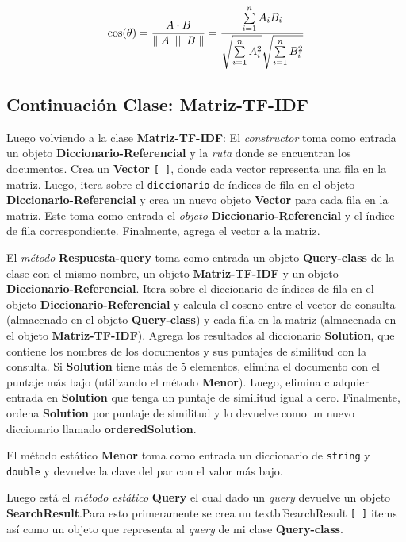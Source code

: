 \documentclass[a4paper,12pt]{article}
\begin{document}
\begin{enumerate}
\begin{equation}
\cos(\theta) = \frac{A\cdot B}{\parallel A\parallel \* \parallel B\parallel}= \frac{\sum\limits_{i=1}^n A_i\* B_i}{\sqrt{\sum\limits_{i=1}^n A_i^2}\* \sqrt{\sum\limits_{i=1}^n B_i^2}}
\end{equation}

\end{enumerate}

\subsection{Continuación Clase: \textbf{Matriz-TF-IDF}}\label{subsec:cont-matriz-TF-IDF}

Luego volviendo a la clase \textbf{Matriz-TF-IDF}:
El \textit{constructor} toma como entrada un objeto \textbf{Diccionario-Referencial} y la \textit{ruta} donde se encuentran los documentos. Crea un \textbf{Vector} \texttt{[ ]}, donde cada vector representa una fila en la matriz. Luego, itera 
sobre el \texttt{diccionario} de índices de fila en el objeto \textbf{Diccionario-Referencial} y crea un nuevo objeto \textbf{Vector} para cada fila en la matriz. Este toma como entrada el \textit{objeto} \textbf{Diccionario-Referencial} y el índice de fila correspondiente. Finalmente, agrega el vector a la matriz.

El \textit{método} \textbf{Respuesta-query} toma como entrada un objeto \textbf{Query-class} de la clase con el mismo nombre, un objeto \textbf{Matriz-TF-IDF} y un objeto \textbf{Diccionario-Referencial}. Itera sobre el diccionario de índices de fila en el objeto \textbf{Diccionario-Referencial} y calcula el coseno entre el vector de consulta (almacenado en el objeto \textbf{Query-class}) y cada fila en la matriz (almacenada en el objeto \textbf{Matriz-TF-IDF}). Agrega los resultados al diccionario \textbf{Solution}, que contiene los nombres de los documentos y sus puntajes de similitud con la consulta. Si \textbf{Solution} tiene más de 5 elementos, elimina el documento con el puntaje más bajo (utilizando el método \textbf{Menor}). Luego, elimina cualquier entrada en \textbf{Solution} que tenga un puntaje de similitud igual a cero. Finalmente, ordena \textbf{Solution} por puntaje de similitud y lo devuelve como un nuevo diccionario llamado \textbf{orderedSolution}.

El método estático \textbf{Menor} toma como entrada un diccionario de \texttt{string} y \texttt{double} y devuelve la clave del par con el valor más bajo.

Luego está el \textit{método estático} \textbf{Query} el cual dado un \textit{query} devuelve un objeto \textbf{SearchResult}.Para esto primeramente se crea un textbf{SearchResult} \texttt{[ ]} items así como un objeto que representa al \textit{query} de mi clase \textbf{Query-class}. 
\end{document}
